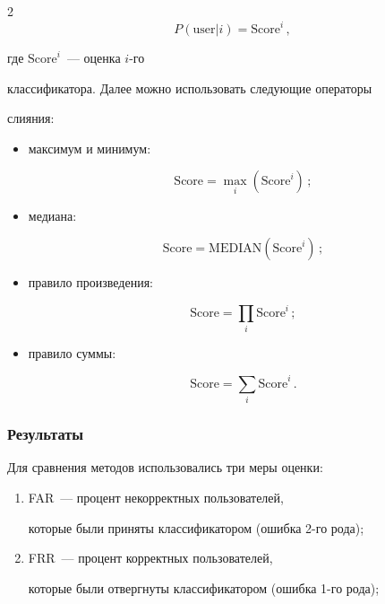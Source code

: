\begin{multicols}{2}
$$

P(\mathrm{user}|i) = \mathrm{Score}^i\,,$$

 где $\mathrm{Score}^i$~--- оценка $i$-го

классификатора. Далее можно использовать следующие операторы

слияния:

\begin{itemize}

    \item максимум и минимум: 

    $$

    \mathrm{Score}= \max\limits_i (\mathrm{Score}^i)\,;

    $$

    \item медиана: 

    $$\mathrm{Score}= \mathrm{MEDIAN}(\mathrm{Score}^i)\,;

    $$

    \item правило произведения: 

    $$

    \mathrm{Score}= \prod\limits_i \mathrm{Score}^i\,;

    $$

    \item правило суммы: 

    $$

    \mathrm{Score}= \sum\limits_i \mathrm{Score}^i\,.

    $$

\end{itemize}



\subsubsection{Результаты}



Для сравнения методов использовались три меры оценки:

\begin{enumerate}[(1)]

    \item FAR~--- процент некорректных пользователей, 

    которые были приняты классификатором (ошибка 2-го рода);

    \item FRR~--- процент корректных пользователей, 

    которые были отвергнуты классификатором (ошибка 1-го рода);


\end{enumerate}
\end{multicols}
